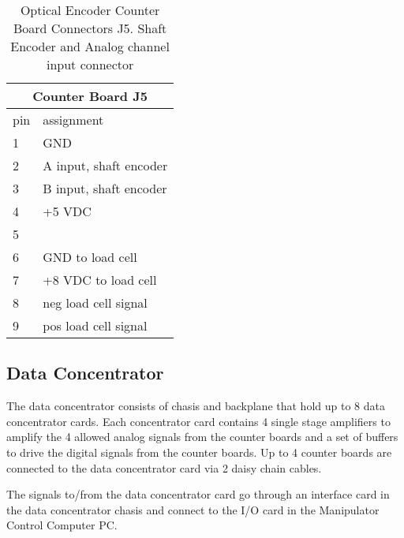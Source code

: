   
\begin{table}[htb]
\begin{center}
\begin{tabular}{|l|l|}
\hline
\multicolumn{2}{|c|}{Counter Board J5}\\
\hline
pin & assignment\\
\hline
1 & GND\\
2 & A input, shaft encoder\\
3 & B input, shaft encoder\\
4 & +5 VDC\\
5 & \\
6 & GND to load cell\\
7 & +8 VDC to load cell\\
8 & neg load cell signal\\
9 & pos load cell signal\\
\hline
\end{tabular}
\caption[Optical Encoder Counter Board Connector J5]
        {Optical Encoder Counter Board Connectors J5.
         Shaft Encoder and Analog channel input connector
        }
\end{center}
\end{table}
  
\clearpage
  
\newpage
\subsection{Data Concentrator}
  The data concentrator consists of chasis and backplane that hold up to
8 data concentrator cards.  Each concentrator card contains 4 single stage
amplifiers to amplify the 4 allowed analog signals from the counter boards
and a set of buffers to drive the digital signals from the counter boards.
Up to 4 counter boards are connected to the data concentrator card via
2 daisy chain cables.
    
    The signals to/from the data concentrator card go through an interface
card in the data concentrator chasis and connect to the I/O card in
the Manipulator Control Computer PC.
  
\newpage
